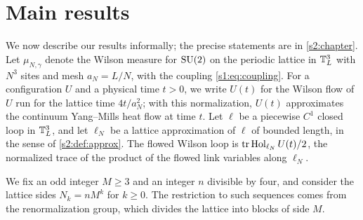 \section{Main results}\label{s1:results}

We now describe our results informally; the precise statements are in \cref{s2:chapter}. Let $\mu_{N,\gamma}$ denote the Wilson measure for $\mathrm{SU}(2)$ on the periodic lattice in $\mathbb T_L^3$ with $N^3$ sites and mesh $a_N=L/N$, with the coupling \eqref{s1:eq:coupling}. For a configuration $U$ and a physical time $t>0$, we write $U(t)$ for the Wilson flow of $U$ run for the lattice time $4t/a_N^2$; with this normalization, $U(t)$ approximates the continuum Yang--Mills heat flow at time $t$. Let $\ell$ be a piecewise $C^1$ closed loop in $\mathbb T_L^3$, and let $\ell_N$ be a lattice approximation of $\ell$ of bounded length, in the sense of \cref{s2:def:approx}. The flowed Wilson loop is $\operatorname{tr}\operatorname{Hol}_{\ell_N}U(t)/2$, the normalized trace of the product of the flowed link variables along $\ell_N$.

We fix an odd integer $M\ge3$ and an integer $n$ divisible by four, and consider the lattice sides $N_k=nM^k$ for $k\ge0$. The restriction to such sequences comes from the renormalization group, which divides the lattice into blocks of side $M$.

